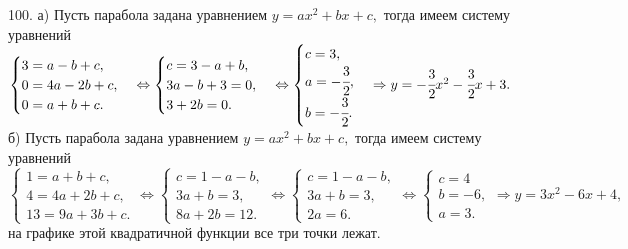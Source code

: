 100. а) Пусть парабола задана уравнением $y=ax^2+bx+c,$ тогда имеем систему уравнений\\ $\begin{cases} 3=a-b+c,\\ 0=4a-2b+c,\\ 0=a+b+c.\end{cases}
\Leftrightarrow \begin{cases} c=3-a+b,\\ 3a-b+3=0,\\ 3+2b=0.\end{cases}
\Leftrightarrow \begin{cases} c=3,\\ a=-\cfrac{3}{2},\\ b=-\cfrac{3}{2}.\end{cases}\Rightarrow y=-\cfrac{3}{2}x^2-\cfrac{3}{2}x+3.$\\
б) Пусть парабола задана уравнением $y=ax^2+bx+c,$ тогда имеем систему уравнений\\ $\begin{cases} 1=a+b+c,\\ 4=4a+2b+c,\\ 13=9a+3b+c.\end{cases}
\Leftrightarrow \begin{cases} c=1-a-b,\\ 3a+b=3,\\ 8a+2b=12.\end{cases}
\Leftrightarrow \begin{cases} c=1-a-b,\\ 3a+b=3,\\ 2a=6.\end{cases}
\Leftrightarrow \begin{cases} c=4\\ b=-6,\\ a=3.\end{cases}
\Rightarrow y=3x^2-6x+4,$ на графике этой квадратичной функции все три точки лежат.\\
